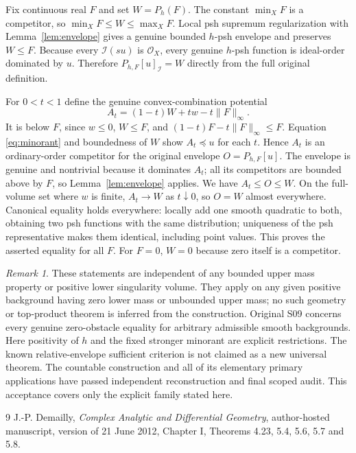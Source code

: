 \documentclass[11pt]{article}
\theoremstyle{remark}\newtheorem{remark}[theorem]{Remark}
\newcommand{\OO}{\mathcal O_X}
\begin{document}
Fix continuous real $F$ and set $W=P_h(F)$. The constant $\min_XF$
is a competitor, so $\min_XF\leq W\leq\max_XF$. Local psh supremum
regularization with Lemma~\ref{lem:envelope} gives a genuine bounded
$h$-psh envelope and preserves $W\leq F$.
Because every $\mathcal I(su)$ is $\OO$, every genuine $h$-psh function
is ideal-order dominated by $u$. Therefore $P_{h,F}[u]_{\mathcal I}=W$
directly from the full original definition.

For $0<t<1$ define the genuine convex-combination potential
\[
 A_t=(1-t)W+tw-t\|F\|_\infty.
\]
It is below $F$, since $w\leq0$, $W\leq F$, and
$(1-t)F-t\|F\|_\infty\leq F$. Equation \eqref{eq:minorant} and
boundedness of $W$ show $A_t\preceq u$ for each $t$. Hence $A_t$ is
an ordinary-order competitor for the original envelope $O=P_{h,F}[u]$.
The envelope is genuine and nontrivial because it dominates $A_t$;
all its competitors are bounded above by $F$, so
Lemma~\ref{lem:envelope} applies. We have $A_t\leq O\leq W$.
On the full-volume set where $w$ is finite, $A_t\to W$ as $t\downarrow0$,
so $O=W$ almost everywhere. Canonical equality holds everywhere: locally
add one smooth quadratic to both, obtaining two psh functions with the
same distribution; uniqueness of the psh representative
\cite[Theorem I.5.8]{Dem} makes them identical, including point values.
This proves the asserted equality for all $F$. For $F=0$, $W=0$ because
zero itself is a competitor.

\begin{remark}
These statements are independent of any bounded upper mass property or
positive lower singularity volume. They apply on any given positive
background having zero lower mass or unbounded upper mass; no such
geometry or top-product theorem is inferred from the construction.
Original S09 concerns every genuine zero-obstacle equality for arbitrary
admissible smooth backgrounds. Here positivity of $h$ and the fixed
stronger minorant are explicit restrictions. The known relative-envelope
sufficient criterion is not claimed as a new universal theorem. The
countable construction and all of its elementary primary applications
have passed independent reconstruction and final scoped audit. This
acceptance covers only the explicit family stated here.
\end{remark}

\begin{thebibliography}{9}
 J.-P. Demailly, \emph{Complex Analytic and Differential
Geometry}, author-hosted manuscript, version of 21 June 2012, Chapter I,
Theorems 4.23, 5.4, 5.6, 5.7 and 5.8.
\end{thebibliography}
\end{document}
